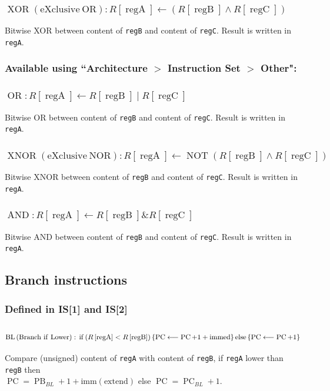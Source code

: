 \documentclass[10pt,a4paper]{article}
\theoremstyle{definition}%
\newcommand{\on}[1]{\operatorname{#1}}
\newcommand{\reg}[1]{\texttt{reg#1}}
\begin{document}
\subsubsection{$\on{XOR} \on{(eXclusive~ OR)}: R\left[ \on{regA} \right] \longleftarrow   \left( R\left[ \on{regB} \right] \wedge R\left[ \on{regC} \right]\right) $}
Bitwise XOR between content of \reg{B} and content of \reg{C}. Result is written in \reg{A}.


\subsubsection*{ Available using ``Architecture $>$ Instruction Set $>$ Other":}

\subsubsection{$\on{OR}: R\left[ \on{regA} \right] \longleftarrow    R\left[ \on{regB} \right] \mid R\left[ \on{regC} \right] $}
Bitwise OR between content of \reg{B} and content of \reg{C}. Result is written in \reg{A}.

\subsubsection{$\on{XNOR} \on{(eXclusive~ NOR)}: R\left[ \on{regA} \right] \longleftarrow  \on{NOT} \left( R\left[ \on{regB} \right] \wedge R\left[ \on{regC} \right]\right) $}
Bitwise XNOR between content of \reg{B} and content of \reg{C}. Result is written in \reg{A}.

\subsubsection{$\on{AND}: R\left[ \on{regA} \right] \longleftarrow    R\left[ \on{regB} \right] \& R\left[ \on{regC} \right] $}
Bitwise AND between content of \reg{B} and content of \reg{C}. Result is written in \reg{A}.

\subsection{Branch instructions}
\subsubsection*{ Defined in IS[1] and IS[2]}
\subsubsection{$\on{BL} \on{(Branch~if~Lower)}:\newline \on{if} \left( R\left[ \on{regA} \right] < R\left[ \on{regB} \right]\right) \left\lbrace\on{PC} \longleftarrow \on{PC}+1+\on{immed} \right\rbrace\on{else} \left\lbrace\on{PC} \longleftarrow \on{PC}+1\right\rbrace $}
Compare (unsigned) content of \reg{A} with content of \reg{B}, if \reg{A} lower than \reg{B} then\\$\on{PC}=\on{PB}_{BL}+1+\on{imm(extend)}$ else $\on{PC}=\on{PC}_{BL}+1$.
\end{document}
